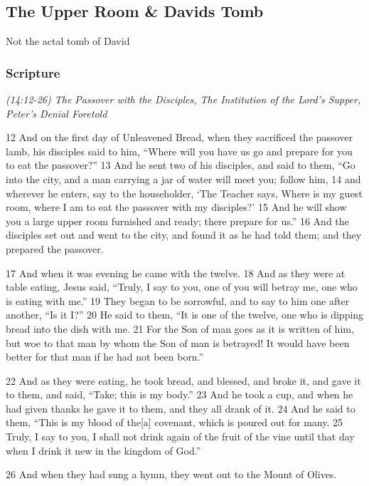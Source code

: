 \documentclass[letterpaper]{report}
\begin{document}
\clearpage
\subsection{The Upper Room \& Davids Tomb}
\begin{multicols}{2}
  Not the actal tomb of David
\end{multicols}
\subsubsection{Scripture}

{\centering
	\emph{(14:12-26) The Passover with the Disciples,
		The Institution of the Lord’s Supper,
		Peter’s Denial Foretold}\\
}
\begin{multicols}{2}
12 And on the first day of Unleavened Bread, when they sacrificed the passover lamb, his disciples said to him, “Where will you have us go and prepare for you to eat the passover?” 13 And he sent two of his disciples, and said to them, “Go into the city, and a man carrying a jar of water will meet you; follow him, 14 and wherever he enters, say to the householder, ‘The Teacher says, Where is my guest room, where I am to eat the passover with my disciples?’ 15 And he will show you a large upper room furnished and ready; there prepare for us.” 16 And the disciples set out and went to the city, and found it as he had told them; and they prepared the passover.

17 And when it was evening he came with the twelve. 18 And as they were at table eating, Jesus said, “Truly, I say to you, one of you will betray me, one who is eating with me.” 19 They began to be sorrowful, and to say to him one after another, “Is it I?” 20 He said to them, “It is one of the twelve, one who is dipping bread into the dish with me. 21 For the Son of man goes as it is written of him, but woe to that man by whom the Son of man is betrayed! It would have been better for that man if he had not been born.”

22 And as they were eating, he took bread, and blessed, and broke it, and gave it to them, and said, “Take; this is my body.” 23 And he took a cup, and when he had given thanks he gave it to them, and they all drank of it. 24 And he said to them, “This is my blood of the[a] covenant, which is poured out for many. 25 Truly, I say to you, I shall not drink again of the fruit of the vine until that day when I drink it new in the kingdom of God.”

26 And when they had sung a hymn, they went out to the Mount of Olives.
\end{multicols}
\end{document}
